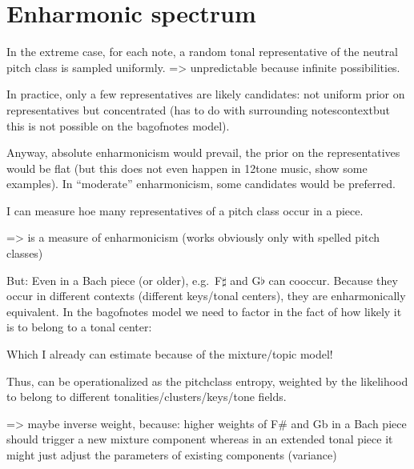 \documentclass[letterpaper,10pt,english]{sphinxmanual}
\begin{document}
\section{Enharmonic spectrum}
\label{\detokenize{diatonicism_chromaticism:enharmonic-spectrum}}
\sphinxAtStartPar
In the extreme case, for each note, a random tonal representative of the
neutral pitch class is sampled uniformly. =\textgreater{} unpredictable because
infinite possibilities.

\sphinxAtStartPar
In practice, only a few representatives are likely candidates: not
uniform prior on representatives but concentrated (has  to do
with surrounding notes\textendash{}context\textendash{}but this is not possible on the
bag\sphinxhyphen{}of\sphinxhyphen{}notes model).

\sphinxAtStartPar
Anyway,  absolute enharmonicism would prevail, the prior on the
representatives would be flat (but this does not even happen in 12\sphinxhyphen{}tone
music, show some examples). In “moderate” enharmonicism, some candidates
would be preferred.

\sphinxAtStartPar
I can measure hoe many representatives of a pitch class occur in a
piece.

\sphinxAtStartPar
=\textgreater{}  is a measure of enharmonicism
(works obviously only with spelled pitch classes)

\sphinxAtStartPar
But: Even in a Bach piece (or older), e.g. F\(\sharp\) and
G\(\flat\) can co\sphinxhyphen{}occur. Because they occur in different contexts
(different keys/tonal centers), they are  enharmonically
equivalent. In the bag\sphinxhyphen{}of\sphinxhyphen{}notes model we need to factor in the fact of
how likely it is to belong to a tonal center:

\sphinxAtStartPar
Which I already can estimate because of the mixture/topic model!

\sphinxAtStartPar
Thus,  can be operationalized as the pitch\sphinxhyphen{}class
entropy, weighted by the likelihood to belong to different
tonalities/clusters/keys/tone fields.

\sphinxAtStartPar
=\textgreater{} maybe inverse weight, because: higher weights of F\# and Gb in a Bach
piece should trigger a new mixture component whereas in an extended
tonal piece it might just adjust the parameters of existing components
(variance)
\end{document}
